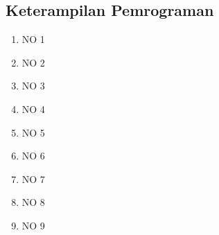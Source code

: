 \subsection{Keterampilan Pemrograman}
\begin{enumerate}
	\item NO 1 

	

	\item NO 2

	

	\item NO 3 

	

	\item NO 4 

	

	\item NO 5 

	

	\item NO 6 

	

	\item NO 7 

	

	\item NO 8

	

	\item NO 9 

	

\end{enumerate}

